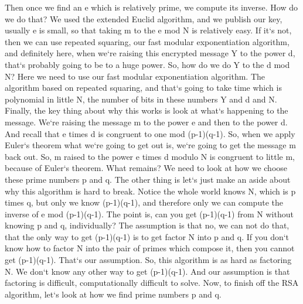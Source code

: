 Then once we find an e which is relatively prime, we compute its inverse.
How do we do that? We used the extended Euclid algorithm, and we publish our key, usually e is small, so that taking m to the e mod N is relatively easy.
If it`s not, then we can use repeated squaring, our fast modular exponentiation algorithm, and definitely here, when we`re raising this encrypted message Y to the power d, that`s probably going to be to a huge power.
So, how do we do Y to the d mod N? Here we need to use our fast modular exponentiation algorithm.
The algorithm based on repeated squaring, and that`s going to take time which is polynomial in little N, the number of bits in these numbers Y and d and N\@.
Finally, the key thing about why this works is look at what`s happening to the message.
We`re raising the message m to the power e and then to the power d.
And recall that e times d is congruent to one mod (p-1)(q-1).
So, when we apply Euler`s theorem what we`re going to get out is, we`re going to get the message m back out.
So, m raised to the power e times d modulo N is congruent to little m, because of Euler`s theorem.
What remains? We need to look at how we choose these prime numbers p and q.
The other thing is let`s just make an aside about why this algorithm is hard to break.
Notice the whole world knows N, which is p times q, but only we know (p-1)(q-1), and therefore only we can compute the inverse of e mod (p-1)(q-1).
The point is, can you get (p-1)(q-1) from N without knowing p and q, individually? The assumption is that no, we can not do that, that the only way to get (p-1)(q-1) is to get factor N into p and q.
If you don`t know how to factor N into the pair of primes which compose it, then you cannot get (p-1)(q-1).
That`s our assumption.
So, this algorithm is as hard as factoring N\@.
We don`t know any other way to get (p-1)(q-1).
And our assumption is that factoring is difficult, computationally difficult to solve.
Now, to finish off the RSA algorithm, let`s look at how we find prime numbers p and q.

